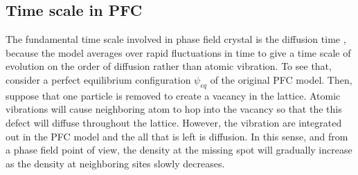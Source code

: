 \documentclass[11pt]{article}
\begin{document}
\subsection{Time scale in PFC}
The fundamental time scale involved in phase field crystal is the diffusion time \parencite{elderModelingelastic2004}, because the model averages over rapid fluctuations in time to give a time scale of evolution on the order of diffusion rather than atomic vibration. To see that, consider a perfect equilibrium configuration $\psi_{eq}$ of the original PFC model. Then, suppose that one particle is removed to create a vacancy in the lattice. Atomic vibrations will cause neighboring atom to hop into the vacancy so that the this defect will diffuse throughout the lattice. However, the vibration are integrated out in the PFC model and the all that is left is diffusion. In this sense, and from a phase field point of view, the density at the missing spot will gradually increase as the density at neighboring sites slowly decreases.\\
\end{document}
